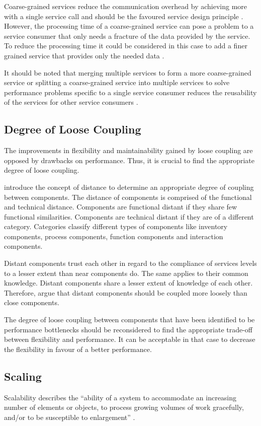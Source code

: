 Coarse-grained services reduce the communication overhead by achieving more with a single service call and should be the favoured service design principle \citep{Hess:2006rs}. However, the processing time of a coarse-grained service can pose a problem to a service consumer that only needs a fracture of the data provided by the service. To reduce the processing time it could be considered in this case to add a finer grained service that provides only the needed data \citep{Josuttis:2007fk}. 

It should be noted that merging multiple services to form a more coarse-grained service or splitting a coarse-grained service into multiple services to solve performance problems specific to a single service consumer reduces the reusability of the services for other service consumers \citep{Josuttis:2007fk}.
\subsection{Degree of Loose Coupling}
The improvements in flexibility and maintainability gained by loose coupling are opposed by drawbacks on performance. Thus, it is crucial to find the appropriate degree of loose coupling. 

\citet{Hess:2006rs} introduce the concept of distance to determine an appropriate degree of coupling between components. The distance of components is comprised of the functional and technical distance. Components are functional distant if they share few functional similarities. Components are technical distant if they are of a different category. Categories classify different types of components like inventory components, process components, function components and interaction components.

Distant components trust each other in regard to the compliance of services levels to a lesser extent than near components do. The same applies to their common knowledge. Distant components share a lesser extent of knowledge of each other. Therefore, \citet{Hess:2006rs} argue that distant components should be coupled more loosely than close components.

The degree of loose coupling between components that have been identified to be performance bottlenecks should be reconsidered to find the appropriate trade-off between flexibility and performance. It can be acceptable in that case to decrease the flexibility in favour of a better performance. 

\subsection{Scaling}
Scalability describes the ``ability of a system to accommodate an increasing number of elements or objects, to process growing volumes of work gracefully, and/or to be susceptible to enlargement'' \citep{Bondi:2000jr}.

